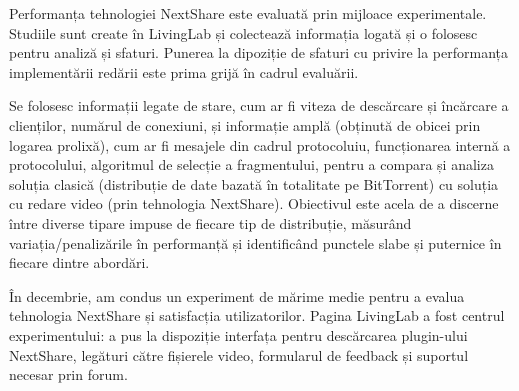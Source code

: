 Performanța tehnologiei NextShare este evaluată prin mijloace experimentale.
Studiile sunt create în LivingLab și colectează informația logată și o folosesc
pentru analiză și sfaturi. Punerea la dipoziție de sfaturi cu privire la
performanța implementării redării este prima grijă în cadrul evaluării.

Se folosesc informații legate de stare, cum ar fi viteza de descărcare și
încărcare a clienților, numărul de conexiuni, și informație amplă
(obținută de obicei prin logarea prolixă), cum ar fi mesajele din cadrul
protocoluiu, funcționarea internă a protocolului, algoritmul de selecție
a fragmentului, pentru a compara și analiza soluția clasică
(distribuție de date bazată în totalitate pe BitTorrent) cu soluția cu
redare video (prin tehnologia NextShare). Obiectivul este acela de a 
discerne între diverse tipare impuse de fiecare tip de distribuție,
măsurând variația/penalizările în performanță și identificând punctele
slabe și puternice în fiecare dintre abordări.

În decembrie, am condus un experiment de mărime medie pentru a evalua
tehnologia NextShare și satisfacția utilizatorilor. Pagina LivingLab a fost
centrul experimentului: a pus la dispoziție interfața pentru descărcarea
plugin-ului NextShare, legături către fișierele video, formularul de feedback
și suportul necesar prin forum.


